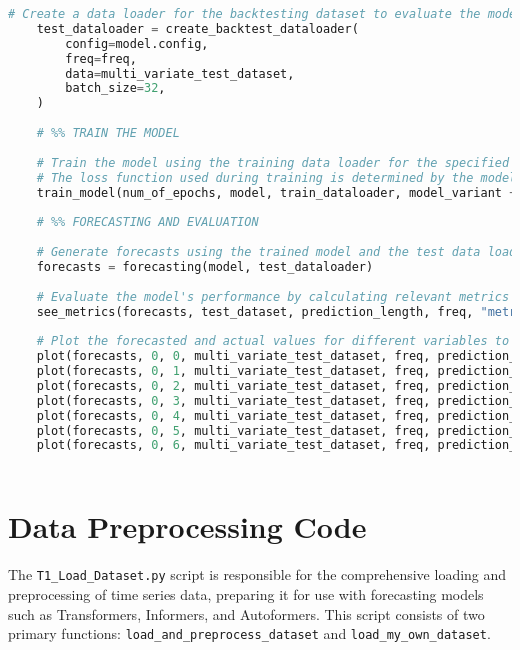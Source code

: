 \begin{lstlisting}[language=Python, caption={Code for entry point and orchestration of the time series forecasting pipeline}, breaklines=true, label=code1]
    # Create a data loader for the backtesting dataset to evaluate the model on unseen data.
    test_dataloader = create_backtest_dataloader(
        config=model.config,
        freq=freq,
        data=multi_variate_test_dataset,
        batch_size=32,
    )
    
    # %% TRAIN THE MODEL
    
    # Train the model using the training data loader for the specified number of epochs.
    # The loss function used during training is determined by the model variant.
    train_model(num_of_epochs, model, train_dataloader, model_variant + "_Loss")
    
    # %% FORECASTING AND EVALUATION
    
    # Generate forecasts using the trained model and the test data loader.
    forecasts = forecasting(model, test_dataloader)
    
    # Evaluate the model's performance by calculating relevant metrics and saving them to a file.
    see_metrics(forecasts, test_dataset, prediction_length, freq, "metrics.txt", model_variant + "_Metrics")
    
    # Plot the forecasted and actual values for different variables to visually assess the model's performance.
    plot(forecasts, 0, 0, multi_variate_test_dataset, freq, prediction_length, model_variant + "_Temperature")
    plot(forecasts, 0, 1, multi_variate_test_dataset, freq, prediction_length, model_variant + "_Relative_humidity")
    plot(forecasts, 0, 2, multi_variate_test_dataset, freq, prediction_length, model_variant + "_Light")
    plot(forecasts, 0, 3, multi_variate_test_dataset, freq, prediction_length, model_variant + "_Soil_Temperature")
    plot(forecasts, 0, 4, multi_variate_test_dataset, freq, prediction_length, model_variant + "_Permittivity")
    plot(forecasts, 0, 5, multi_variate_test_dataset, freq, prediction_length, model_variant + "_Electroconductivity")
    plot(forecasts, 0, 6, multi_variate_test_dataset, freq, prediction_length, model_variant + "_Diameter")
    

\end{lstlisting}

\section{Data Preprocessing Code}

The \texttt{T1\_Load\_Dataset.py} script is responsible for the comprehensive loading and preprocessing of time series data, preparing it for use with forecasting models such as Transformers, Informers, and Autoformers. This script consists of two primary functions: \texttt{load\_and\_preprocess\_dataset} and \texttt{load\_my\_own\_dataset}.


